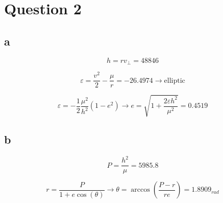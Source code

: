 \section{Question 2}
\subsection{a}
$$
h = rv_{\perp} = 48846
$$

$$
\varepsilon = \dfrac{v^2}{2} - \dfrac{\mu}{r} = -26.4974 \to \text{elliptic}
$$

$$
\varepsilon = -\dfrac{1}{2}\dfrac{\mu^2}{h^2}(1-e^2) \to e = \sqrt{1 + \dfrac{2 \varepsilon h^2}{\mu^2}} =  0.4519 
$$

\subsection{b}
$$
P = \dfrac{h^2}{\mu} = 5985.8
$$

$$
r = \dfrac{P}{1+e\cos(\theta)} \to \theta = \arccos \left(\dfrac{P-r}{re}\right) = 1.8909_{rad}
$$